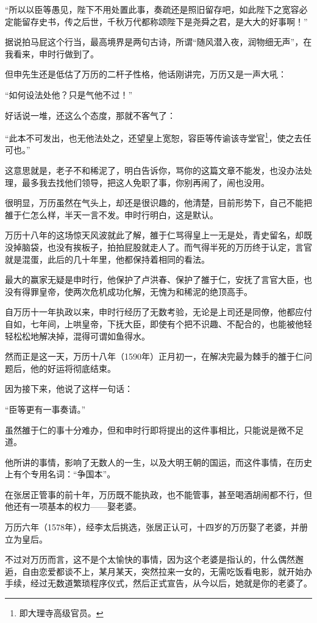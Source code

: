 \begin{multicols}{\theparacolNo}
		“所以以臣等愚见，陛下不用处置此事，奏疏还是照旧留存吧，如此陛下之宽容必定能留存史书，传之后世，千秋万代都称颂陛下是尧舜之君，是大大的好事啊！”

		据说拍马屁这个行当，最高境界是两句古诗，所谓“随风潜入夜，润物细无声”，在我看来，申时行做到了。

		但申先生还是低估了万历的二杆子性格，他话刚讲完，万历又是一声大吼：

		“如何设法处他？只是气他不过！”

		好话说一堆，还这么个态度，那就不客气了：

		“此本不可发出，也无他法处之，还望皇上宽恕，容臣等传谕该寺堂官\footnote{即大理寺高级官员。}，使之去任可也。”

		这意思就是，老子不和稀泥了，明白告诉你，骂你的这篇文章不能发，也没办法处理，最多我去找他们领导，把这人免职了事，你别再闹了，闹也没用。

		很明显，万历虽然在气头上，却还是很识趣的，他清楚，目前形势下，自己不能把雒于仁怎么样，半天一言不发。申时行明白，这是默认。

		万历十八年的这场惊天风波就此了解，雒于仁骂得皇上一无是处，青史留名，却既没掉脑袋，也没有挨板子，拍拍屁股就走人了。而气得半死的万历终于认定，言官就是混蛋，此后的几十年里，他都保持着相同的看法。

		最大的赢家无疑是申时行，他保护了卢洪春、保护了雒于仁，安抚了言官大臣，也没有得罪皇帝，使两次危机成功化解，无愧为和稀泥的绝顶高手。

		自万历十一年执政以来，申时行经历了无数考验，无论是上司还是同僚，他都应付自如，七年间，上哄皇帝，下抚大臣，即使有个把不识趣、不配合的，也能被他轻轻松松地解决掉，混得可谓如鱼得水。

		然而正是这一天，万历十八年（1590年）正月初一，在解决完最为棘手的雒于仁问题后，他的好运将彻底结束。

		因为接下来，他说了这样一句话：

		“臣等更有一事奏请。”

		虽然雒于仁的事十分难办，但和申时行即将提出的这件事相比，只能说是微不足道。

		他所讲的事情，影响了无数人的一生，以及大明王朝的国运，而这件事情，在历史上有个专用名词：“争国本”。

		在张居正管事的前十年，万历既不能执政，也不能管事，甚至喝酒胡闹都不行，但他还有一项基本的权力——娶老婆。

		万历六年（1578年），经李太后挑选，张居正认可，十四岁的万历娶了老婆，并册立为皇后。

		不过对万历而言，这不是个太愉快的事情，因为这个老婆是指认的，什么偶然邂逅，自由恋爱都谈不上，某月某天，突然拉来一女的，无需吃饭看电影，就开始办手续，经过无数道繁琐程序仪式，然后正式宣告，从今以后，她就是你的老婆了。


\end{multicols}
